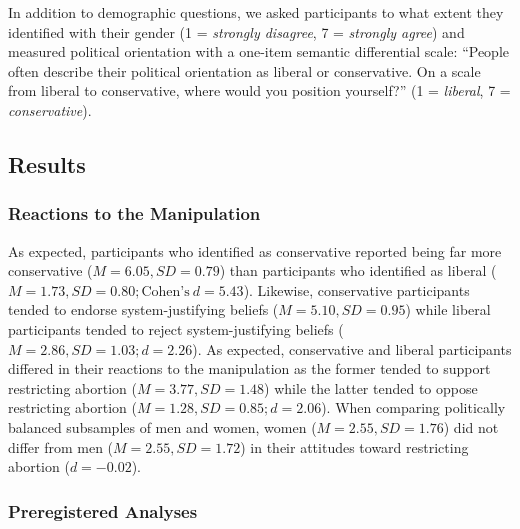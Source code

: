 \documentclass[twocolumn, 11pt, letterpaper]{article}
\begin{document}
In addition to demographic questions, we asked participants to what
extent they identified with their gender (1 = \emph{strongly disagree},
7 = \emph{strongly agree}) and measured political orientation with a
one-item semantic differential scale: ``People often describe their
political orientation as liberal or conservative. On a scale from
liberal to conservative, where would you position yourself?'' (1 =
\emph{liberal}, 7 = \emph{conservative}).

\hypertarget{results-2}{%
\subsection{Results}\label{results-2}}

\hypertarget{reactions-to-the-manipulation-2}{%
\subsubsection{Reactions to the
Manipulation}\label{reactions-to-the-manipulation-2}}

As expected, participants who identified as conservative reported being
far more conservative (\(M = 6.05, SD = 0.79\)) than participants who
identified as liberal
(\(M = 1.73, SD = 0.80; \text{Cohen's}~d = 5.43\)). Likewise,
conservative participants tended to endorse system-justifying beliefs
(\(M = 5.10, SD = 0.95\)) while liberal participants tended to reject
system-justifying beliefs (\(M = 2.86, SD = 1.03; d = 2.26\)). As
expected, conservative and liberal participants differed in their
reactions to the manipulation as the former tended to support
restricting abortion (\(M = 3.77, SD = 1.48\)) while the latter tended
to oppose restricting abortion (\(M = 1.28, SD = 0.85; d = 2.06\)). When
comparing politically balanced subsamples of men and women, women
(\(M = 2.55, SD = 1.76\)) did not differ from men
(\(M = 2.55, SD = 1.72\)) in their attitudes toward restricting abortion
(\(d = -0.02\)).

\hypertarget{preregistered-analyses-2}{%
\subsubsection{Preregistered Analyses}\label{preregistered-analyses-2}}
\end{document}
